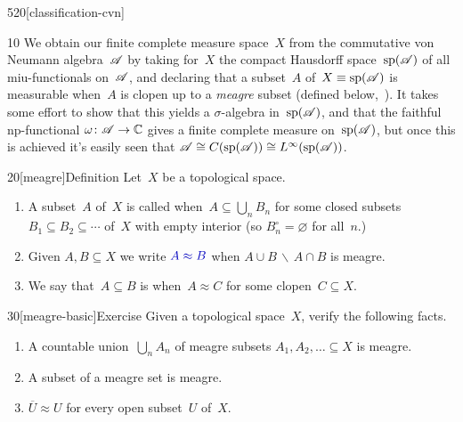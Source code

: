 \begin{parsec}{520}[classification-cvn]
\begin{point}{10}
We obtain our finite complete measure space~$X$
from the commutative von Neumann algebra~$\mathscr{A}$
by taking for~$X$ the compact Hausdorff space~$\mathrm{sp}(\mathscr{A})$
of all miu-functionals on~$\mathscr{A}$,
and declaring that a subset~$A$ of~$X\equiv \mathrm{sp}(\mathscr{A})$ 
is measurable when~$A$ is clopen up to
a \emph{meagre}
subset
(defined below,~).
It takes some effort to show
that this yields a $\sigma$-algebra
in~$\mathrm{sp}(\mathscr{A})$,
and that the faithful np-functional $\omega\colon\mathscr{A}\to \mathbb{C}$
gives a finite complete measure on~$\mathrm{sp}(\mathscr{A})$,
but once this is achieved
it's easily seen that
$\mathscr{A}\cong C(\mathrm{sp}(\mathscr{A}))\cong L^\infty(\mathrm{sp}(\mathscr{A}))$.
\end{point}
\begin{point}{20}[meagre]{Definition}%
Let~$X$ be a topological space.
\begin{enumerate}
\item
A subset~$A$ of~$X$
is called %
when~$A\subseteq \bigcup_n B_n$
for some closed subsets $B_1\subseteq B_2\subseteq \dotsb$
of~$X$ with empty interior (so  $B_n^\circ=\varnothing$
for all~$n$.)
\item
Given $A,B\subseteq X$ 
we write $\Define{A\approx B}$
 when
$A\cup B\,\backslash\,A\cap B$
is meagre.
\item
We say that~$A\subseteq B$
is %
when~$A\approx C$
for some clopen~$C\subseteq X$.
\end{enumerate}
\spacingfix%
\end{point}%
\begin{point}{30}[meagre-basic]{Exercise}%
Given a topological space~$X$,
verify the following facts.
\begin{enumerate}
\item
A countable union~$\bigcup_n A_n$
of meagre subsets $A_1,A_2,\dotsc\subseteq X $ is meagre.
\item
A subset of a meagre set is meagre.
\item
$\overline{U}\approx U$
for every open subset~$U$ of~$X$.


\end{enumerate}
\end{point}
\end{parsec}
